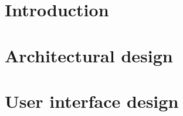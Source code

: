 \documentclass{Configuration_Files/PoliMi3i_thesis}
\begin{document}
\thispagestyle{empty}
\tableofcontents %
\thispagestyle{empty}
\cleardoublepage

%
%
%    
%

\mainmatter %

\chapter{Introduction}
\label{ch:introduction}%



\chapter{Architectural design}
\label{ch:architectural_design}%

\chapter{User interface design}
\label{c:user_interface_design}%

\end{document}
